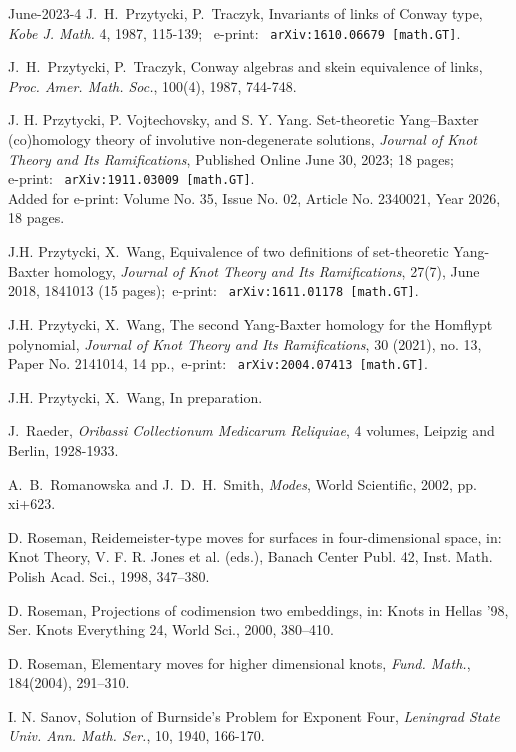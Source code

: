 \documentclass[12pt]{amsart}
\begin{document}
\begin{thebibliography}{June-2023-4}
J.~H.~Przytycki, P.~Traczyk, Invariants of links of Conway type,
{\it Kobe J. Math. } 4, 1987, 115-139; \
e-print: \ {\tt arXiv:1610.06679 [math.GT]}.

J.~H.~Przytycki, P.~Traczyk, Conway algebras and skein equivalence
of links, {\it Proc. Amer. Math. Soc.},  100(4), 1987, 744-748.

 J. H. Przytycki, P. Vojtechovsky, and S. Y. Yang. Set-theoretic Yang–Baxter (co)homology theory of involutive non-degenerate solutions, {\it Journal of Knot Theory and Its Ramifications}, Published Online June 30, 2023; 18 pages;\\
e-print: \ {\tt arXiv:1911.03009 [math.GT]}. \\{\color{red} Added for e-print: Volume No. 35, Issue No. 02, Article No. 2340021, Year 2026, 18 pages.}

J.H. Przytycki, X.~Wang, 
Equivalence of two definitions of set-theoretic Yang-Baxter homology,
{\it Journal of Knot Theory and Its Ramifications}, 27(7), June 2018, 1841013 (15 pages);\
e-print: \ {\tt arXiv:1611.01178 [math.GT]}.

J.H. Przytycki, X.~Wang, The second Yang-Baxter homology for the Homflypt polynomial,
{\it Journal of Knot Theory and Its Ramifications}, 30 (2021), no. 13, Paper No. 2141014, 14 pp.,\
e-print: \ {\tt   arXiv:2004.07413 [math.GT]}.

\bibitem[PrWa3]{PrWa3}
J.H. Przytycki, X.~Wang, In preparation.

\bibitem[Ra]{Ra}
J.~Raeder,  {\it Oribassi Collectionum Medicarum Reliquiae},  4 volumes,
Leipzig and Berlin, 1928-1933.

\bibitem[RoSm]{RoSm} A.~B.~Romanowska and J.~D.~H.~Smith,
{\it Modes}, World Scientific, 2002, pp. xi+623.

\bibitem[Ros1]{Ros1}
D. Roseman, Reidemeister-type moves for surfaces in four-dimensional space, in: Knot Theory, V. F. R. Jones et al. (eds.), Banach Center Publ. 42, Inst. Math. Polish Acad. Sci., 1998, 347–380. 

\bibitem[Ros2]{Ros2} D. Roseman, Projections of codimension two embeddings, in: Knots in Hellas '98, Ser. Knots Everything 24, World Sci., 2000, 380–410.

 D. Roseman, Elementary moves for higher dimensional knots, {\it Fund. Math.}, 184(2004), 291–310.

 I. N. Sanov, Solution of Burnside's Problem for
Exponent Four, \textit{Leningrad State Uni\textit{v.} Ann. Math. Ser.}, 10,
1940, 166-170.


\end{thebibliography}
\end{document}
